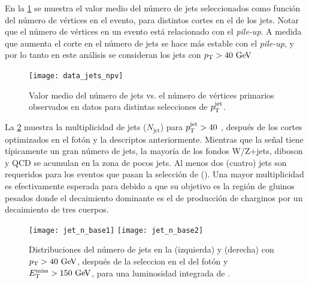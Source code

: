 En la \cref{fig:jets_npv} se muestra el valor medio del número de jets
seleccionados como función del número de vértices en el evento, para distintos
cortes en el {\pt} de los jets. Notar que el número de vértices en un evento
está relacionado con el \emph{pile-up}. A medida que aumenta el corte en {\pt}
el número de jets se hace más estable con el \emph{pile-up}, y por lo tanto en
este análisis se consideran los jets con $\pt>40\gev$



\begin{figure}[!htbp]
  \centering
  \texttt{[image: data\_jets\_npv]}
  \caption{Valor medio del número de jets vs. el número de vértices primarios
    observados en datos para distintas selecciones de $p_{\mathrm{T}}^{\mathrm{jet}}$.}
    \label{fig:jets_npv}
\end{figure}




La \cref{fig:opt_jet_n} muestra la multiplicidad de jets ($N_{\mathrm{jet}}$)
para $p_{\mathrm{T}}^{\mathrm{jet}} > 40$ \gev, después de los cortes optimizados en el
fotón y la {\met} descriptos anteriormente. Mientras que la señal tiene
típicamente un gran número de jets, la mayoría de los fondos W/Z+jets, diboson y
QCD se acumulan en la zona de pocos jets. Al menos dos (cuatro) jets son
requeridos para los eventos que pasan la selección de {\SRL} ({\SRH}). Una mayor
multiplicidad es efectivamente esperada para {\SRL} debido a que su objetivo es
la región de gluinos pesados donde el decaimiento dominante es el de producción
de charginos por un decaimiento de tres cuerpos.

\begin{figure}[!htbp]
  \centering
  \texttt{[image: jet\_n\_base1]}
  \texttt{[image: jet\_n\_base2]}
  \caption{Distribuciones del número de jets en la {\SRL} (izquierda) y {\SRH} (derecha) con $\pt >
    40 \gev$, después de la seleccion en el {\pt} del fotón y $\met > 150\gev$,
    para una luminosidad integrada de {\ilumi}.}
  \label{fig:opt_jet_n}
\end{figure}

